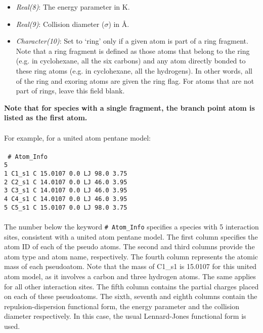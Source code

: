 {{{\begin{itemize}
must match what is given for \texttt{\# VDW\_Style}  (subsection \ref{sec:VDW_Style}) in the input file.  
At present only 'LJ' style is permitted.
%
\item {\it Real(8)}: The energy parameter in K.
%
\item {\it Real(9)}: Collision diameter ($\sigma$)  in \AA.
%
\item {\it Character(10)}: Set to `ring' only if a given atom is part of a
ring fragment. Note that a ring fragment is defined as those atoms that belong to the ring
(e.g. in cyclohexane, all the six carbons) and any atom directly bonded to these ring atoms
(e.g. in cyclohexane, all the hydrogens).  In other words, all of the ring and exoring atoms are given the ring
flag. For atoms that are not part of rings, leave this field blank. 
\end{itemize} 
%
{\bf Note that for species with a single fragment, the branch point atom
 is listed as the first atom.} \\ \\
%
For example, for a united atom pentane model: \\ \\
%
\texttt{
\# Atom\_Info\\
5\\
1    C1\_s1    C    15.0107    0.0    LJ    98.0    3.75\\
2    C2\_s1    C    14.0107    0.0    LJ    46.0    3.95\\
3    C3\_s1    C    14.0107    0.0    LJ    46.0    3.95\\
4    C4\_s1    C    14.0107    0.0    LJ    46.0    3.95\\
5    C5\_s1    C    15.0107    0.0    LJ    98.0    3.75\\
} \\ 
%
The number below the keyword \texttt{\# Atom\_Info} specifies a species with 5 interaction sites, consistent with a united atom pentane model. 
The first column specifies the atom ID of each of the pseudo atoms.
The second and third columns provide the atom type and atom name, respectively.
The fourth column represents the atomic mass of each pseudoatom. Note that the mass of
C1\_s1 is 15.0107 for this united atom model, as it involves a carbon and three hydrogen atoms. 
The same applies for all other interaction sites.
The fifth column contains the partial charges placed on each of these pseudoatoms.
The sixth, seventh and eighth columns contain the repulsion-dispersion functional form, the energy parameter
and the collision diameter respectively. In this case, the usual Lennard-Jones functional form is used. 
}}}
